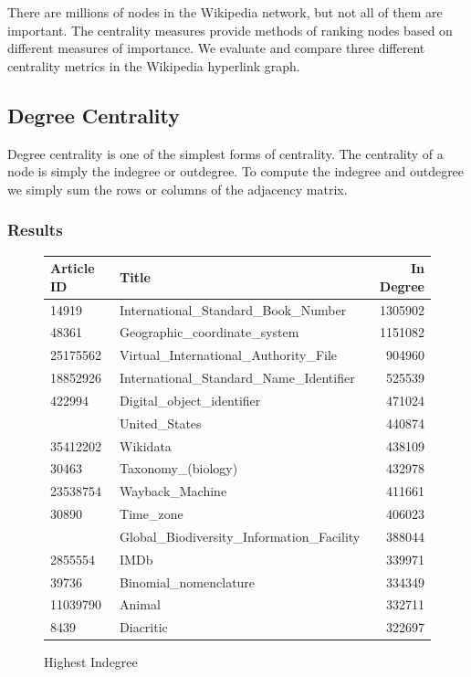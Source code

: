 \documentclass{article}
\begin{document}
There are millions of nodes in the Wikipedia network, but not all of them are important.
The centrality measures provide methods of ranking nodes based on different measures of importance.
We evaluate and compare three different centrality metrics in the Wikipedia hyperlink graph.

\subsection{Degree Centrality}

Degree centrality is one of the simplest forms of centrality. The centrality of a node is simply the indegree or outdegree.
To compute the indegree and outdegree we simply sum the rows or columns of the adjacency matrix.

\subsubsection{Results}
\begin{figure}[H]
    \centering
    \caption{Highest Indegree}
    \begin{tabular}{llr}
        \toprule
        Article ID & Title & In Degree\\
        \midrule
        14919 & International\_Standard\_Book\_Number & 1305902\\
        48361 & Geographic\_coordinate\_system & 1151082\\
        25175562 & Virtual\_International\_Authority\_File & 904960\\
        18852926 & International\_Standard\_Name\_Identifier & 525539\\
        422994 & Digital\_object\_identifier & 471024\\
        \addlinespace
        3434750 & United\_States & 440874\\
        35412202 & Wikidata & 438109\\
        30463 & Taxonomy\_(biology) & 432978\\
        23538754 & Wayback\_Machine & 411661\\
        30890 & Time\_zone & 406023\\
        \addlinespace
        2987862 & Global\_Biodiversity\_Information\_Facility & 388044\\
        2855554 & IMDb & 339971\\
        39736 & Binomial\_nomenclature & 334349\\
        11039790 & Animal & 332711\\
        8439 & Diacritic & 322697\\
        \bottomrule
    \end{tabular}
\end{figure}
    
\end{document}
